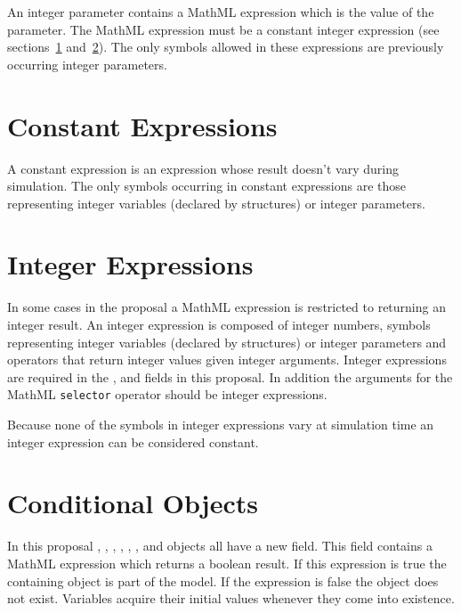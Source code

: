 \documentclass{cekarticle}
\begin{document}
An integer parameter contains a MathML expression which is the value of the parameter.  The MathML expression must be a constant integer
expression (see sections~\ref{sec:constantExpressions} and~\ref{sec:integerExpressions}).  The only symbols allowed
in these expressions are previously occurring integer parameters.

\section{Constant Expressions}
\label{sec:constantExpressions}

A constant expression is an expression whose result doesn't vary during simulation.
The only symbols occurring in constant expressions are those representing integer variables (declared by  structures)
or integer parameters.

\section{Integer Expressions}
\label{sec:integerExpressions}

In some cases in the proposal a MathML expression is restricted to returning an integer result.
An integer expression is composed of integer numbers, symbols representing integer variables (declared by  structures)
or integer parameters and
operators that return integer values given integer arguments.  Integer expressions are required in the
,  and  fields in this proposal. In addition the arguments for the
MathML \texttt{selector} operator should be integer expressions.

Because none of the symbols in integer expressions vary at simulation time an integer expression can be considered constant.

\section{Conditional Objects}
\label{sec:exists}
In this proposal , , , , , ,  and 
objects all have a new  field.  This field contains a MathML expression which returns a boolean result.  If this expression
is true the containing object is part of the model.  If the expression is false the object does not exist.  Variables acquire their initial values
whenever they come into existence.
\end{document}
